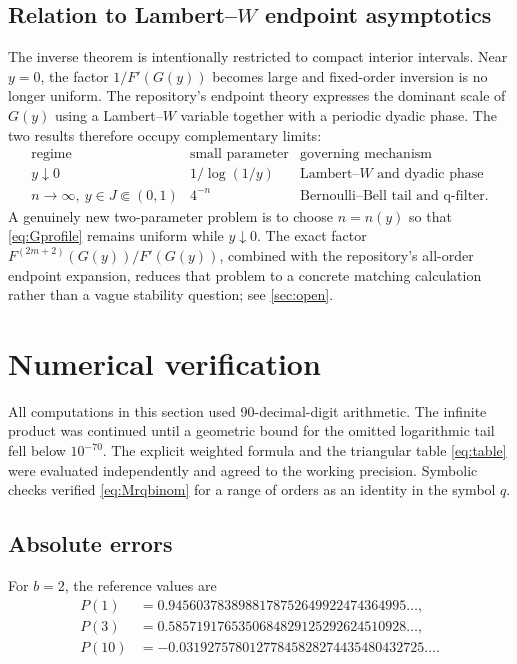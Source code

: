 \documentclass[11pt]{article}
\theoremstyle{definition}
\theoremstyle{remark}
\begin{document}
\subsection{Relation to \texorpdfstring{Lambert--\(W\)}{Lambert-W} endpoint asymptotics}

The inverse theorem is intentionally restricted to compact interior intervals.
Near \(y=0\), the factor \(1/F'(G(y))\) becomes large and fixed-order inversion
is no longer uniform. The repository's endpoint theory expresses the dominant
scale of \(G(y)\) using a Lambert--\(W\) variable together with a periodic dyadic
phase. The two results therefore occupy complementary limits:
\[
 \begin{array}{c|c|c}
 \text{regime}&\text{small parameter}&\text{governing mechanism}\\ \hline
 y\downarrow0 & 1/\log(1/y) & \text{Lambert--}W\text{ and dyadic phase}\\
 n\to\infty,\ y\in J\Subset(0,1)&4^{-n}&\text{Bernoulli--Bell tail and q-filter}.
 \end{array}
\]
A genuinely new two-parameter problem is to choose \(n=n(y)\) so that
\eqref{eq:Gprofile} remains uniform while \(y\downarrow0\). The exact factor
\(F^{(2m+2)}(G(y))/F'(G(y))\), combined with the repository's all-order endpoint
expansion, reduces that problem to a concrete matching calculation rather than a
vague stability question; see \cref{sec:open}.

\section{Numerical verification}
\label{sec:numerics}

All computations in this section used 90-decimal-digit arithmetic. The infinite
product was continued until a geometric bound for the omitted logarithmic tail
fell below \(10^{-70}\). The explicit weighted formula and the triangular table
\eqref{eq:table} were evaluated independently and agreed to the working
precision. Symbolic checks verified \eqref{eq:Mrqbinom} for a range of orders as
an identity in the symbol \(q\).

\subsection{Absolute errors}

For \(b=2\), the reference values are
\begin{align*}
 P(1)&=0.9456037838988178752649922474364995\ldots,\\
 P(3)&=0.5857191765350684829125292624510928\ldots,\\
 P(10)&=-0.03192757801277845828274435480432725\ldots.
\end{align*}
\end{document}
